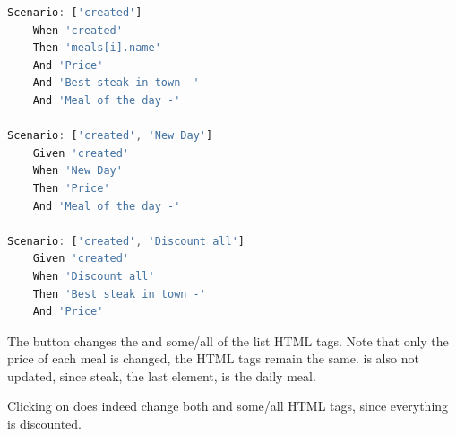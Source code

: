 \label{eval:scenarios_meal}
\begin{lstlisting}[language=JavaScript,   basicstyle=\fontsize{9}{9}\selectfont\ttfamily]
Scenario: ['created']
	When 'created'
	Then 'meals[i].name'
	And 'Price'
	And 'Best steak in town -'
	And 'Meal of the day -'

Scenario: ['created', 'New Day']
	Given 'created'
	When 'New Day'
	Then 'Price'
	And 'Meal of the day -'

Scenario: ['created', 'Discount all']
	Given 'created'
	When 'Discount all'
	Then 'Best steak in town -'
	And 'Price'
\end{lstlisting}

The  button changes the  and some/all of the  list HTML tags. Note that only the price of each meal is changed, the  HTML tags remain the same.  is also not updated, since steak, the last element, is the daily meal. 

Clicking on  does indeed change both  and some/all  HTML tags, since everything is discounted.